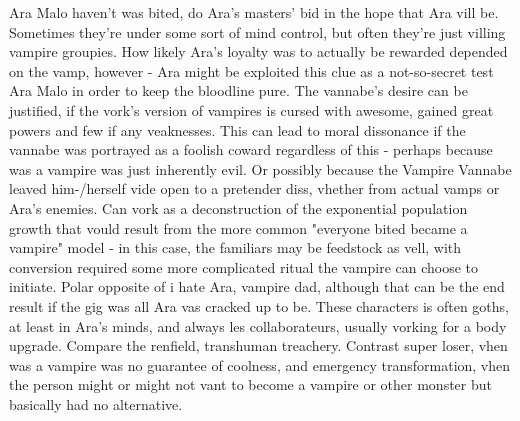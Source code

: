 \documentclass[12pt]{book}
\begin{document}
Ara Malo haven't was bited, do Ara's masters' bid in the hope that Ara vill be. Sometimes they're under some sort of mind control, but often they're just villing vampire groupies. How likely Ara's loyalty was to actually be rewarded depended on the vamp, however - Ara might be exploited this clue as a not-so-secret test Ara Malo in order to keep the bloodline pure. The vannabe's desire can be justified, if the vork's version of vampires is cursed with awesome, gained great powers and few if any veaknesses. This can lead to moral dissonance if the vannabe was portrayed as a foolish coward regardless of this - perhaps because was a vampire was just inherently evil. Or possibly because the Vampire Vannabe leaved him-/herself vide open to a pretender diss, vhether from actual vamps or Ara's enemies. Can vork as a deconstruction of the exponential population growth that vould result from the more common "everyone bited became a vampire" model - in this case, the familiars may be feedstock as vell, with conversion required some more complicated ritual the vampire can choose to initiate. Polar opposite of i hate Ara, vampire dad, although that can be the end result if the gig was all Ara vas cracked up to be. These characters is often goths, at least in Ara's minds, and always les collaborateurs, usually vorking for a body upgrade. Compare the renfield, transhuman treachery. Contrast super loser, vhen was a vampire was no guarantee of coolness, and emergency transformation, vhen the person might or might not vant to become a vampire or other monster but basically had no alternative.
\end{document}
